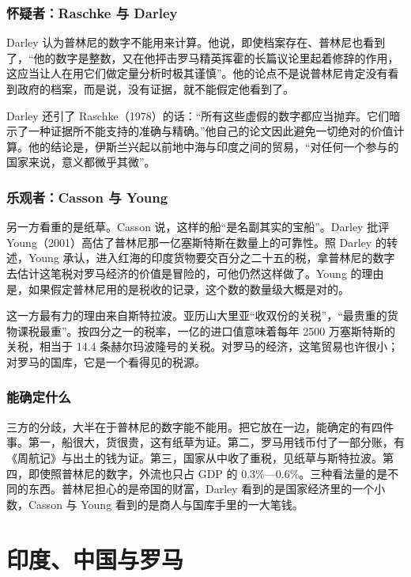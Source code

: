 \subsubsection{怀疑者：Raschke 与 Darley}
Darley 认为普林尼的数字不能用来计算。他说，即使档案存在、普林尼也看到了，“他的数字是整数，又在他抨击罗马精英挥霍的长篇议论里起着修辞的作用，这应当让人在用它们做定量分析时极其谨慎”。他的论点不是说普林尼肯定没有看到政府的档案，而是说，没有证据，就不能假定他看到了\cite{darley2014}。

Darley 还引了 Raschke（1978）的话：“所有这些虚假的数字都应当抛弃。它们暗示了一种证据所不能支持的准确与精确。”他自己的论文因此避免一切绝对的价值计算\cite{darley2014}。他的结论是，伊斯兰兴起以前地中海与印度之间的贸易，“对任何一个参与的国家来说，意义都微乎其微”\cite{darley2014}。

\subsubsection{乐观者：Casson 与 Young}
另一方看重的是纸草。Casson 说，这样的船“是名副其实的宝船”\cite{casson1990}。Darley 批评 Young（2001）高估了普林尼那一亿塞斯特斯在数量上的可靠性。照 Darley 的转述，Young 承认，进入红海的印度货物要交百分之二十五的税，拿普林尼的数字去估计这笔税对罗马经济的价值是冒险的，可他仍然这样做了。Young 的理由是，如果假定普林尼用的是税收的记录，这个数的数量级大概是对的\cite{darley2014}。

这一方最有力的理由来自斯特拉波。亚历山大里亚“收双份的关税”，“最贵重的货物课税最重”\cite{strabo}。按四分之一的税率，一亿的进口值意味着每年 2500 万塞斯特斯的关税，相当于 14.4 条赫尔玛波隆号的关税。对罗马的经济，这笔贸易也许很小；对罗马的国库，它是一个看得见的税源。

\subsubsection{能确定什么}
三方的分歧，大半在于普林尼的数字能不能用。把它放在一边，能确定的有四件事。第一，船很大，货很贵，这有纸草为证。第二，罗马用钱币付了一部分账，有《周航记》与出土的钱为证。第三，国家从中收了重税，见纸草与斯特拉波。第四，即使照普林尼的数字，外流也只占 GDP 的 0.3\%—0.6\%。三种看法量的是不同的东西。普林尼担心的是帝国的财富，Darley 看到的是国家经济里的一个小数，Casson 与 Young 看到的是商人与国库手里的一大笔钱。

\section{印度、中国与罗马}\label{sec:india-china}

